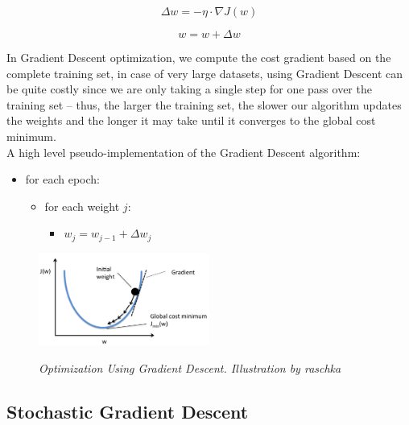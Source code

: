 \[
  \Delta w = -\eta \cdot \nabla J(w)
\]


\[
  w = w + \Delta w
\]



In Gradient Descent optimization, we compute the cost gradient based on the
complete training set, in case of very large datasets, using Gradient Descent
can be quite costly since we are only taking a single step for one pass over
the training set – thus, the larger the training set, the slower our algorithm
updates the weights and the longer it may take until it converges to the global
cost minimum. \\

A high level pseudo-implementation of the Gradient Descent algorithm: \\

\begin{itemize}[label=\(\circ\)]
  \item for each epoch:
    \begin{itemize}[label=\(\circ\), topsep=0pt]
      \item for each weight \(j\):
        \begin{itemize}[label=\(\circ\), topsep=5pt]
          \item \(w_j = w_{j-1} + \Delta w_j\)
        \end{itemize}
    \end{itemize}
\end{itemize}

\begin{figure}[H]
  \centering
  \includegraphics[width=0.5\textwidth]{imatges/preliminaries/optimization.png}
  \caption[Optimization Using Gradient Descent]{\textit{Optimization Using Gradient Descent. Illustration by raschka}}
  {\label{fig:optimization}}
\end{figure}

\newpage

\subsection{Stochastic Gradient Descent}

